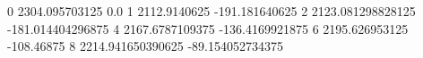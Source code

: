0 2304.095703125 0.0
1 2112.9140625 -191.181640625
2 2123.081298828125 -181.014404296875
4 2167.6787109375 -136.4169921875
6 2195.626953125 -108.46875
8 2214.941650390625 -89.154052734375

